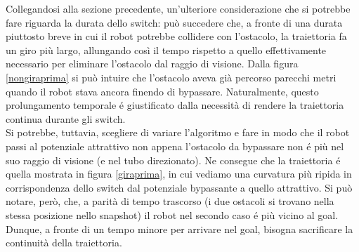 \documentclass[14pt,a4paper]{extarticle}
\begin{document}
Collegandosi alla sezione precedente, un'ulteriore considerazione che si potrebbe fare riguarda la durata dello switch: può succedere che, a fronte di una durata piuttosto breve in cui il robot potrebbe collidere con l'ostacolo, la traiettoria fa un giro più largo, allungando così il tempo rispetto a quello effettivamente necessario per eliminare l'ostacolo dal raggio di visione. Dalla figura \ref{nongiraprima} si può intuire che l'ostacolo aveva già percorso parecchi metri quando il robot stava ancora finendo di bypassare. Naturalmente, questo prolungamento temporale é giustificato dalla necessità di rendere la traiettoria continua durante gli switch.\\
Si potrebbe, tuttavia, scegliere di variare l'algoritmo e fare in modo che il robot passi al potenziale attrattivo non appena l'ostacolo da bypassare non é più nel suo raggio di visione (e nel tubo direzionato). Ne consegue che la traiettoria é quella mostrata in figura \ref{giraprima}, in cui vediamo una curvatura più ripida in corrispondenza dello switch dal potenziale bypassante a quello attrattivo. Si può notare, però, che, a parità di tempo trascorso (i due ostacoli si trovano nella stessa posizione nello snapshot) il robot nel secondo caso é più vicino al goal. Dunque, a fronte di un tempo minore per arrivare nel goal, bisogna sacrificare la continuità della traiettoria. 
\end{document}
